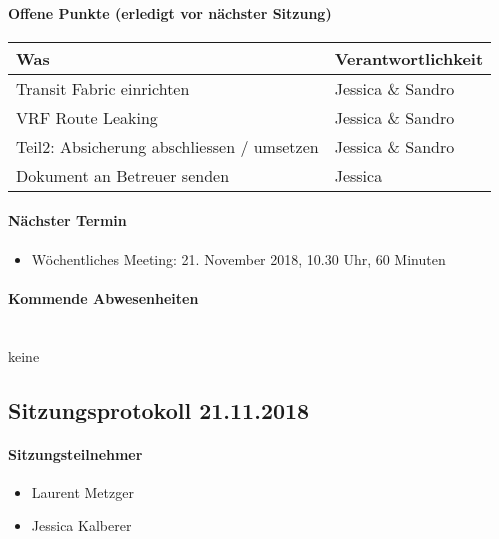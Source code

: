 \paragraph{Offene Punkte (erledigt vor nächster Sitzung)} \mbox{}
\begin{table}[H]
	\centering
	\begin{tabularx}{\textwidth}{X | p{4.5cm}}
		\rowcolor{gray!50}
		\textbf{Was} & \textbf{Verantwortlichkeit} \\
		\hline	
		Transit Fabric einrichten & Jessica \& Sandro  \\
		VRF Route Leaking & Jessica \& Sandro \\
		Teil2: Absicherung abschliessen / umsetzen & Jessica \& Sandro \\
		Dokument an Betreuer senden & Jessica \\
	\end{tabularx}
	\label{tab:my-label}
\end{table}

\paragraph{Nächster Termin}
\begin{itemize}	
	\item Wöchentliches Meeting: 21. November 2018, 10.30 Uhr, 60 Minuten
\end{itemize}

\paragraph{Kommende Abwesenheiten} \mbox{}\\
keine



\newpage





\subsection{Sitzungsprotokoll 21.11.2018}

\paragraph{Sitzungsteilnehmer}
\begin{itemize}	
	\item Laurent Metzger
	\item Jessica Kalberer
\end{itemize}

